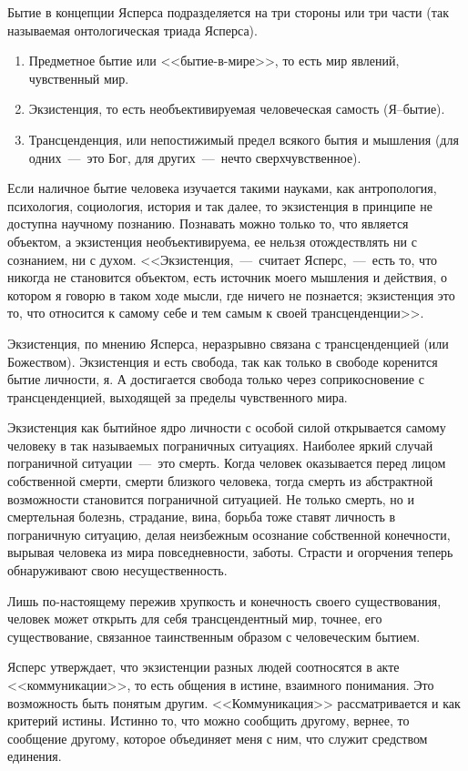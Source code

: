 \documentclass{bmstu}
\begin{document}
Бытие в концепции Ясперса подразделяется на три стороны или три части (так называемая онтологическая триада Ясперса).

\begin{enumerate}
	\item Предметное бытие или <<бытие-в-мире>>, то есть мир явлений, чувственный мир.
	\item Экзистенция, то есть необъективируемая человеческая самость (Я--бытие).
	\item Трансценденция, или непостижимый предел всякого бытия и мышления (для одних~---~это Бог, для других~---~нечто сверхчувственное).
\end{enumerate}

Если наличное бытие человека изучается такими науками, как антропология, психология, социология, история и так далее, то экзистенция в принципе не доступна научному познанию. Познавать можно только то, что является объектом, а экзистенция необъективируема, ее нельзя отождествлять ни с сознанием, ни с духом. <<Экзистенция,~---~считает Ясперс,~---~есть то, что никогда не становится объектом, есть источник моего мышления и действия, о котором я говорю в таком ходе мысли, где ничего не познается; экзистенция это то, что относится к самому себе и тем самым к своей трансценденции>>.

Экзистенция, по мнению Ясперса, неразрывно связана с трансценденцией (или Божеством). Экзистенция и есть свобода, так как только в свободе коренится бытие личности, я. А достигается свобода только через соприкосновение с трансценденцией, выходящей за пределы чувственного мира.

Экзистенция как бытийное ядро личности с особой силой открывается самому человеку в так называемых пограничных ситуациях. Наиболее яркий случай пограничной ситуации~---~это смерть. Когда человек оказывается перед лицом собственной смерти, смерти близкого человека, тогда смерть из абстрактной возможности становится пограничной ситуацией. Не только смерть, но и смертельная болезнь, страдание, вина, борьба тоже ставят личность в пограничную ситуацию, делая неизбежным осознание собственной конечности, вырывая человека из мира повседневности, заботы. Страсти и огорчения теперь обнаруживают свою несущественность.

Лишь по-настоящему пережив хрупкость и конечность своего существования, человек может открыть для себя трансцендентный мир, точнее, его существование, связанное таинственным образом с человеческим бытием.

Ясперс утверждает, что экзистенции разных людей соотносятся в акте <<коммуникации>>, то есть общения в истине, взаимного понимания. Это возможность быть понятым другим. <<Коммуникация>> рассматривается и как критерий истины. Истинно то, что можно сообщить другому, вернее, то сообщение другому, которое объединяет меня с ним, что служит средством единения.
\end{document}
